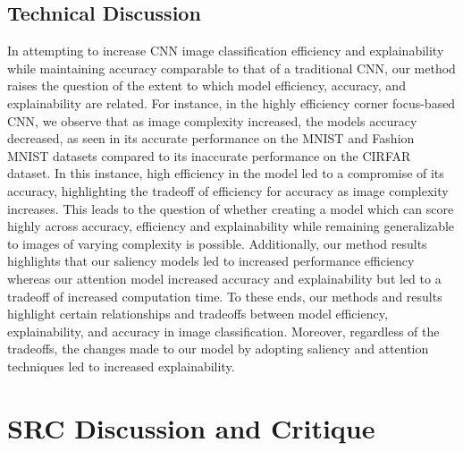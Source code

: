 \subsection{Technical Discussion}

In attempting to increase CNN image classification efficiency and explainability while maintaining accuracy comparable to that of a traditional CNN, our method raises the question of the extent to which model efficiency, accuracy, and explainability are related. For instance, in the highly efficiency corner focus-based CNN, we observe that as image complexity increased, the models accuracy decreased, as seen in its accurate performance on the MNIST and Fashion MNIST datasets compared to its inaccurate performance on the CIRFAR dataset. In this instance, high efficiency in the model led to a compromise of its accuracy, highlighting the tradeoff of efficiency for accuracy as image complexity increases. This leads to the question of whether creating a model which can score highly across accuracy, efficiency and explainability while remaining generalizable to images of varying complexity is possible. Additionally, our method results highlights that our saliency models led to increased performance efficiency whereas our attention model increased accuracy and explainability but led to a tradeoff of increased computation time. To these ends, our methods and results highlight certain relationships and tradeoffs between model efficiency, explainability, and accuracy in image classification. Moreover, regardless of the tradeoffs, the changes made to our model by adopting saliency and attention techniques led to increased explainability. 


\section{SRC Discussion and Critique}


